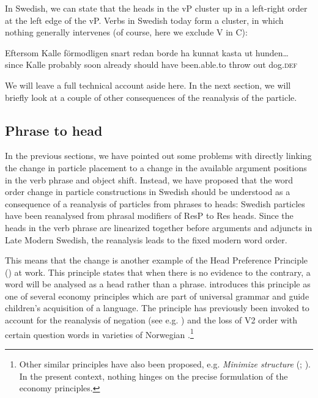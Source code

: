 \documentclass[output=paper]{langscibook}
\begin{document}
\z

In Swedish, we can state that the heads in the vP cluster up in a left-right order at the left edge of the vP. Verbs in Swedish today form a cluster, in which nothing generally intervenes (of course, here we exclude V in C):


\ea\label{ex:lalu:57}
\gll  Eftersom  Kalle    förmodligen  snart  redan    borde  ha    kunnat kasta     ut   hunden…\\
since         Kalle    probably     soon     already   should  have   been.able.to throw   out  dog\textsc{.def}\\
\z


We will leave a full technical account aside here. In the next section, we will briefly look at a couple of other consequences of the reanalysis of the particle. 


\subsection{Phrase to head}\label{sec:lalu:6.3}

In the previous sections, we have pointed out some problems with directly linking the change in particle placement to a change in the available argument positions in the verb phrase and object shift. Instead, we have proposed that the word order change in particle constructions in Swedish should be understood as a consequence of a reanalysis of particles from phrases to heads: Swedish particles have been reanalysed from phrasal modifiers of ResP to Res heads. Since the heads in the verb phrase are linearized together before arguments and adjuncts in Late Modern Swedish, the reanalysis leads to the fixed modern word order. 



This means that the change is another example of the Head Preference Principle (\citealt{van_Gelderen2004}) at work. This principle states that when there is no evidence to the contrary, a word will be analysed as a head rather than a phrase. \citet{van_Gelderen2004} introduces this principle as one of several economy principles which are part of universal grammar and guide children’s acquisition of a language. The principle has previously been invoked to account for the reanalysis of negation (see e.g. \citealt{Van_gelderen2008}) and the loss of V2 order with certain question words in varieties of Norwegian \citep{WestergaardEtAl2017}.\footnote{Other similar principles have also been proposed, e.g. \textit{Minimize structure} (\citealt{CardinalettiStarke1999}; \citealt{BreitbarthEtAl2020}). In the present context, nothing hinges on the precise formulation of the economy principles.}  
\end{document}
